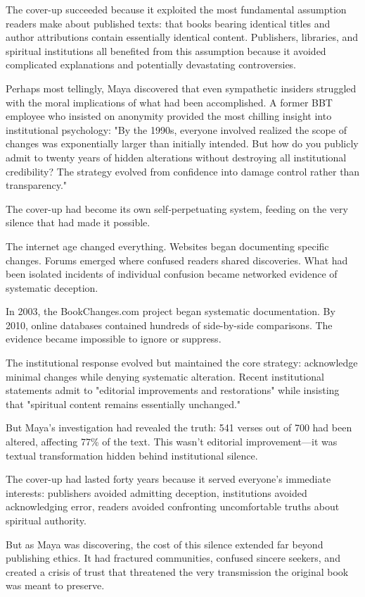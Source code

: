 \documentclass[11pt,twoside]{book}
\begin{document}
The cover-up succeeded because it exploited the most fundamental assumption readers make about published texts: that books bearing identical titles and author attributions contain essentially identical content. Publishers, libraries, and spiritual institutions all benefited from this assumption because it avoided complicated explanations and potentially devastating controversies.

Perhaps most tellingly, Maya discovered that even sympathetic insiders struggled with the moral implications of what had been accomplished. A former BBT employee who insisted on anonymity provided the most chilling insight into institutional psychology: "By the 1990s, everyone involved realized the scope of changes was exponentially larger than initially intended. But how do you publicly admit to twenty years of hidden alterations without destroying all institutional credibility? The strategy evolved from confidence into damage control rather than transparency."

The cover-up had become its own self-perpetuating system, feeding on the very silence that had made it possible.

The internet age changed everything. Websites began documenting specific changes. Forums emerged where confused readers shared discoveries. What had been isolated incidents of individual confusion became networked evidence of systematic deception.

In 2003, the BookChanges.com project began systematic documentation. By 2010, online databases contained hundreds of side-by-side comparisons. The evidence became impossible to ignore or suppress.

The institutional response evolved but maintained the core strategy: acknowledge minimal changes while denying systematic alteration. Recent institutional statements admit to "editorial improvements and restorations" while insisting that "spiritual content remains essentially unchanged."

But Maya's investigation had revealed the truth: 541 verses out of 700 had been altered, affecting 77\% of the text. This wasn't editorial improvement—it was textual transformation hidden behind institutional silence.

The cover-up had lasted forty years because it served everyone's immediate interests: publishers avoided admitting deception, institutions avoided acknowledging error, readers avoided confronting uncomfortable truths about spiritual authority.

But as Maya was discovering, the cost of this silence extended far beyond publishing ethics. It had fractured communities, confused sincere seekers, and created a crisis of trust that threatened the very transmission the original book was meant to preserve.
\end{document}
